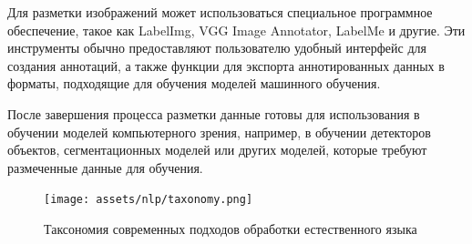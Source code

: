 Для разметки изображений может использоваться специальное программное обеспечение, такое как LabelImg, VGG Image Annotator, LabelMe и другие. Эти инструменты обычно предоставляют пользователю удобный интерфейс для создания аннотаций, а также функции для экспорта аннотированных данных в форматы, подходящие для обучения моделей машинного обучения.

После завершения процесса разметки данные готовы для использования в обучении моделей компьютерного зрения, например, в обучении детекторов объектов, сегментационных моделей или других моделей, которые требуют размеченные данные для обучения.



\begin{figure}[h]
    \centering
    \texttt{[image: assets/nlp/taxonomy.png]}
    \caption{Таксономия современных подходов обработки естественного языка}
    \label{llm_taxonomy}
\end{figure}